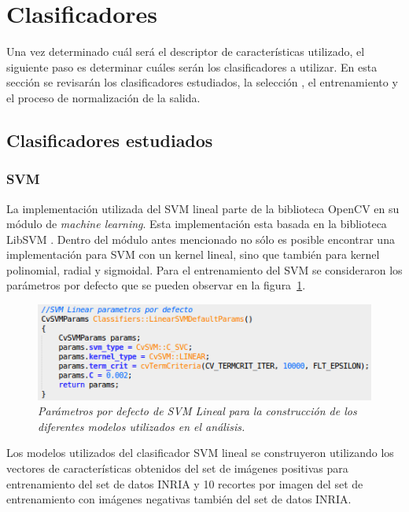 \section{Clasificadores}
\label{sec:clasif}
 
Una vez determinado cuál será el descriptor de características utilizado, el siguiente paso es determinar cuáles serán los clasificadores a utilizar. En esta sección se revisarán los clasificadores estudiados, la selección , el entrenamiento y el proceso de normalización de la salida.

\subsection{Clasificadores estudiados}

\subsubsection{SVM}
\label{propuestas:svmlineal}

La implementación utilizada del SVM lineal parte de la biblioteca OpenCV en su módulo de \textit{machine learning}. Esta implementación esta basada en la biblioteca LibSVM \citep{Chang2011}. Dentro del módulo antes mencionado no sólo es posible encontrar una implementación para SVM con un kernel lineal, sino que también para kernel polinomial, radial y sigmoidal.
Para el entrenamiento del SVM se consideraron los parámetros por defecto que se pueden observar en la figura~\ref{fig:svmparams}. 

\begin{figure}[H]
  \centering
  \includegraphics[scale=.6]{images/svmparams}
  \caption{\em Parámetros por defecto de SVM Lineal para la construcción de los diferentes modelos utilizados en el análisis. }  
  \label{fig:svmparams}
\end{figure}

Los modelos utilizados del clasificador SVM lineal se construyeron utilizando los vectores de características obtenidos del set de imágenes positivas para entrenamiento del set de datos INRIA y 10 recortes por imagen del set de entrenamiento con imágenes negativas también del set de datos INRIA.

